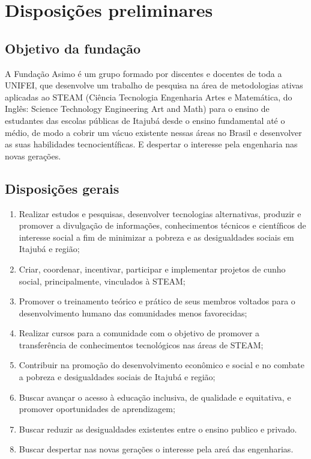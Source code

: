 \chapter{Disposições preliminares}
    \section{Objetivo da fundação}
    A Fundação Asimo é um grupo formado por discentes e docentes de toda a UNIFEI, que desenvolve um trabalho de pesquisa na área de metodologias ativas aplicadas ao STEAM (Ciência Tecnologia Engenharia Artes e Matemática, do Inglês: Science Technology Engineering Art and Math) para o ensino de estudantes das escolas públicas de Itajubá desde o ensino fundamental até o médio, de modo a cobrir um vácuo existente nessas áreas no Brasil e desenvolver as suas habilidades tecnocientíficas. E despertar o interesse pela engenharia nas novas gerações.
    
    \section{Disposições gerais}
    \begin{enumerate}
        \item Realizar estudos e pesquisas, desenvolver tecnologias alternativas, produzir e promover a divulgação de informações, conhecimentos técnicos e científicos de interesse social a fim de minimizar a pobreza e as desigualdades sociais em Itajubá e região;
        \item Criar, coordenar, incentivar, participar e implementar projetos de cunho social, principalmente, vinculados à STEAM;
        \item Promover o treinamento teórico e prático de seus membros voltados para o desenvolvimento humano das comunidades menos favorecidas;
        \item Realizar cursos para a comunidade com o objetivo de promover a transferência de conhecimentos tecnológicos nas áreas de STEAM;
        \item Contribuir na promoção do desenvolvimento econômico e social e no combate a pobreza e desigualdades sociais de Itajubá e região;
        \item Buscar avançar o acesso à educação inclusiva, de qualidade e equitativa, e promover oportunidades de aprendizagem;
        \item Buscar reduzir as desigualdades existentes entre o ensino publico e privado.
        \item Buscar despertar nas novas gerações o interesse pela areá das engenharias.
    \end{enumerate}
 
